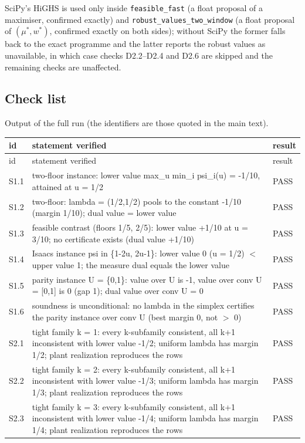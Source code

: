 \documentclass[11pt,a4paper]{article}
\theoremstyle{plain}
\theoremstyle{definition}
\theoremstyle{remark}
\begin{document}
SciPy's HiGHS is used only inside \texttt{feasible\_fast} (a float proposal of a maximiser, confirmed exactly) and \texttt{robust\_values\_two\_window} (a float proposal of $(\mu^\ast,w^\ast)$, confirmed exactly on both sides); without SciPy the former falls back to the exact programme and the latter reports the robust values as unavailable, in which case checks D2.2--D2.4 and D2.6 are skipped and the remaining checks are unaffected.

\subsection{Check list}
Output of the full run (the identifiers are those quoted in the main text).
\begin{footnotesize}
\begin{longtable}{p{1.1cm}p{12.6cm}p{0.9cm}}
\toprule
id & statement verified & result\\
\midrule
\endfirsthead
\toprule
id & statement verified & result\\
\midrule
\endhead
\bottomrule
\endlastfoot
S1.1 & two-floor instance: lower value max\_u min\_i psi\_i(u) = -1/10, attained at u = 1/2 & PASS\\
S1.2 & two-floor: lambda = (1/2,1/2) pools to the constant -1/10 (margin 1/10); dual value = lower value & PASS\\
S1.3 & feasible contrast (floors 1/5, 2/5): lower value +1/10 at u = 3/10; no certificate exists (dual value +1/10) & PASS\\
S1.4 & Isaacs instance psi in \{1-2u, 2u-1\}: lower value 0 (u = 1/2) $<$ upper value 1; the measure dual equals the lower value & PASS\\
S1.5 & parity instance U = \{0,1\}: value over U is -1, value over conv U = [0,1] is 0 (gap 1); dual value over conv U = 0 & PASS\\
S1.6 & soundness is unconditional: no lambda in the simplex certifies the parity instance over conv U (best margin 0, not $>$ 0) & PASS\\
S2.1 & tight family k = 1: every k-subfamily consistent, all k+1 inconsistent with lower value -1/2; uniform lambda has margin 1/2; plant realization reproduces the rows & PASS\\
S2.2 & tight family k = 2: every k-subfamily consistent, all k+1 inconsistent with lower value -1/3; uniform lambda has margin 1/3; plant realization reproduces the rows & PASS\\
S2.3 & tight family k = 3: every k-subfamily consistent, all k+1 inconsistent with lower value -1/4; uniform lambda has margin 1/4; plant realization reproduces the rows & PASS\\

\end{longtable}
\end{footnotesize}
\end{document}
